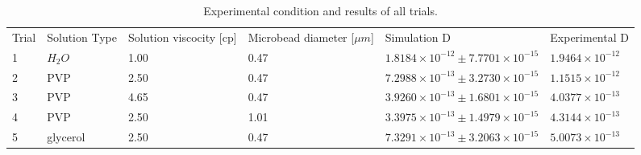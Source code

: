\documentclass[iop,revtex4]{emulateapj_mod}
\begin{document}
\begin{table*}[t]
\centering
\caption{Experimental condition and results of all trials.}
\label{my-label}
\begin{tabular}{llllll} \label{table}
Trial & Solution Type & Solution viscocity [cp] & Microbead diameter [$\mu m$] & Simulation D          & Experimental D \\
1     & $H_2O$         &  1.00                           & 0.47                              & $1.8184\times 10^{-12}\pm 7.7701\times 10^{-15}$ & $1.9464\times 10^{-12}$     \\
2     & PVP           & 2.50                        & 0.47                              & $7.2988\times 10^{-13}\pm3.2730\times 10^{-15}$ & $1.1515\times 10^{-12}$     \\
3     & PVP           & 4.65                        & 0.47                              & $3.9260\times 10^{-13}\pm1.6801\times 10^{-15}$ & $4.0377\times 10^{-13}$     \\
4     & PVP           & 2.50                        & 1.01                              & $3.3975\times 10^{-13}\pm1.4979\times 10^{-15}$ & $4.3144\times 10^{-13}$     \\
5     & glycerol      & 2.50                        & 0.47                              & $7.3291\times 10^{-13}\pm3.2063\times 10^{-15}$ & $5.0073\times 10^{-13}$    
\end{tabular}
\end{table*}
\end{document}
